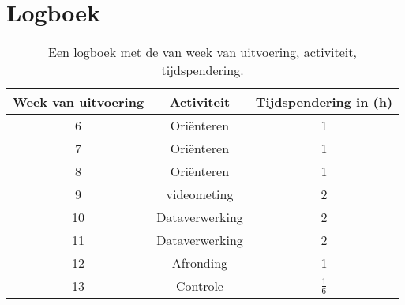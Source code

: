 \documentclass[numbers=endperiod]{scrartcl}
\begin{document}
\newpage
\appendix
\section{Logboek}
\begin{table}[ht]
\centering
\caption{Een logboek met de van week van uitvoering, activiteit, tijdspendering.}
\begin{tabular}{Scc}
\toprule
{Week van uitvoering} & Activiteit & Tijdspendering in (\si{\hour})\\
 & Oriënteren & 1\\
7 & Oriënteren & 1\\
8 & Oriënteren & 1\\
9 & videometing & 2\\
10 & Dataverwerking & 2\\
11 & Dataverwerking & 2\\
12 & Afronding & 1\\
13 & Controle & $\frac{1}{6}$\\
\bottomrule
\end{tabular}
\end{table}
\end{document}
